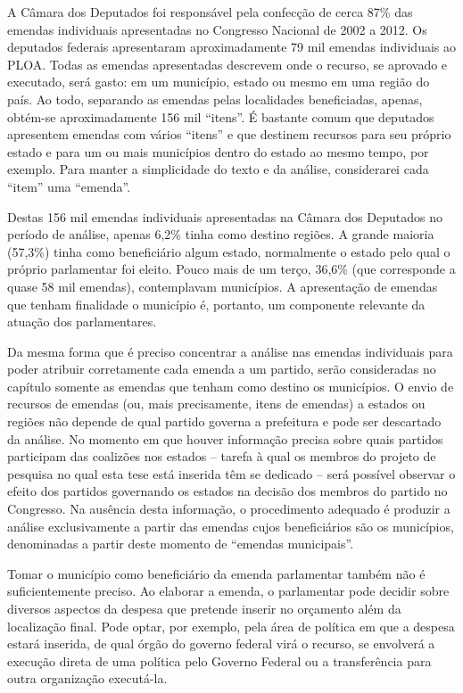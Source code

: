A Câmara dos Deputados foi responsável pela confecção de cerca 87\% das emendas individuais apresentadas no Congresso Nacional de 2002 a 2012. Os deputados federais apresentaram aproximadamente 79 mil emendas individuais ao PLOA. Todas as emendas apresentadas descrevem onde o recurso, se aprovado e executado, será gasto: em um município, estado ou mesmo em uma região do país. Ao todo, separando as emendas pelas localidades beneficiadas, apenas, obtém-se aproximadamente 156 mil ``itens''. É bastante comum que deputados apresentem emendas com vários ``itens'' e que destinem recursos para seu próprio estado e para um ou mais municípios dentro do estado ao mesmo tempo, por exemplo. Para manter a simplicidade do texto e da análise, considerarei cada ``item'' uma ``emenda''.

Destas 156 mil emendas individuais apresentadas na Câmara dos Deputados no período de análise, apenas 6,2\% tinha como destino regiões. A grande maioria (57,3\%) tinha como beneficiário algum estado, normalmente o estado pelo qual o próprio parlamentar foi eleito. Pouco mais de um terço, 36,6\% (que corresponde a quase 58 mil emendas), contemplavam municípios. A apresentação de emendas que tenham finalidade o município é, portanto, um componente relevante da atuação dos parlamentares.

Da mesma forma que é preciso concentrar a análise nas emendas individuais para poder atribuir corretamente cada emenda a um partido, serão consideradas no capítulo somente as emendas que tenham como destino os municípios. O envio de recursos de emendas (ou, mais precisamente, itens de emendas) a estados ou regiões não depende de qual partido governa a prefeitura e pode ser descartado da análise. No momento em que houver informação precisa sobre quais partidos participam das coalizões nos estados -- tarefa à qual os membros do projeto de pesquisa no qual esta tese está inserida têm se dedicado -- será possível observar o efeito dos partidos governando os estados na decisão dos membros do partido no Congresso. Na ausência desta informação, o procedimento adequado é produzir a análise exclusivamente a partir das emendas cujos beneficiários são os municípios, denominadas a partir deste momento de ``emendas municipais''.

Tomar o município como beneficiário da emenda parlamentar também não é suficientemente preciso. Ao elaborar a emenda, o parlamentar pode decidir sobre diversos aspectos da despesa que pretende inserir no orçamento além da localização final. Pode optar, por exemplo, pela área de política em que a despesa estará inserida, de qual órgão do governo federal virá o recurso, se envolverá a execução direta de uma política pelo Governo Federal ou a transferência para outra organização executá-la.

